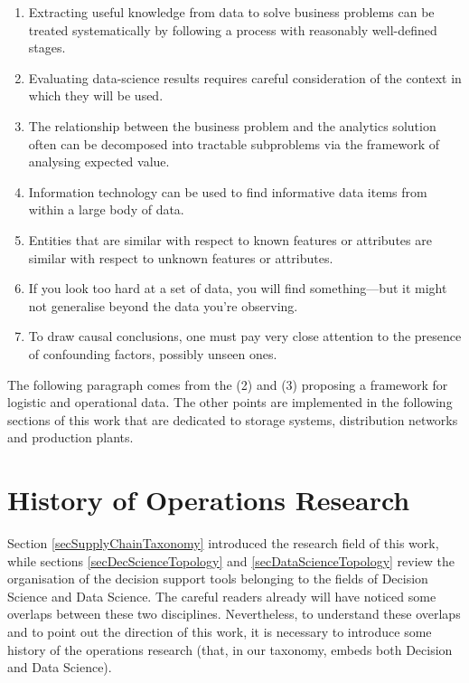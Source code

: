 \begin{enumerate}
    \item Extracting useful knowledge from data to solve business problems can be treated systematically by following a process with reasonably well-deﬁned stages.
    \item Evaluating data-science results requires careful consideration of the context in which they will be used.
    \item The relationship between the business problem and the analytics solution often can be decomposed into tractable subproblems via the framework of analysing expected value.
    \item Information technology can be used to ﬁnd informative data items from within a large body of data.
    \item Entities that are similar with respect to known features or attributes are similar with respect to unknown features or attributes.
    \item If you look too hard at a set of data, you will ﬁnd something—but it might not generalise beyond the data you’re observing.
   \item To draw causal conclusions, one must pay very close attention to the presence of confounding factors, possibly unseen ones.

\end{enumerate}

The following paragraph comes from the (2) and (3) proposing a framework for logistic and operational data. The other points are implemented in the following sections of this work that are dedicated to storage systems, distribution networks and production plants.

\section{History of Operations Research}
Section \ref{secSupplyChainTaxonomy} introduced the research field of this work, while sections \ref{secDecScienceTopology} and \ref{secDataScienceTopology} review the organisation of the decision support tools belonging to the fields of Decision Science and Data Science. The careful readers already will have noticed some overlaps between these two disciplines. Nevertheless, to understand these overlaps and to point out the direction of this work, it is necessary to introduce some history of the operations research (that, in our taxonomy, embeds both Decision and Data Science). \par

